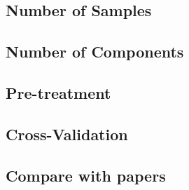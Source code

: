 \documentclass[a4paper,12pt,titlepage]{article} %
\numberwithin{equation}{section}  %
\begin{document}
	\subsection{Number of Samples}
	\label{sec:Number of Samples}
	
	\subsection{Number of Components}
	\label{sec:Number of Components}
	
	\subsection{Pre-treatment}
	\label{sec:Pre-treatment}
	
	\subsection{Cross-Validation}
	\label{sec:Cross-Validation}
	
	\subsection{Compare with papers}
	\label{sec:Compare with papers}
	
\end{document}
